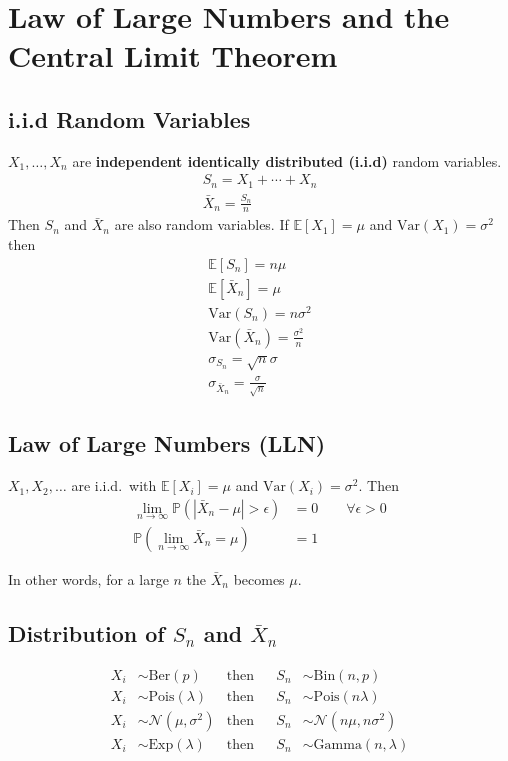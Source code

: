 \section{Law of Large Numbers and the Central Limit Theorem}

\subsection{i.i.d Random Variables}

$X_1, \ldots , X_n$ are \textbf{independent identically distributed (i.i.d)} random variables.
\begin{gather*}
    S_n = X_1 + \cdots + X_n \\
    \bar{X}_n = \frac{S_n}{n}
\end{gather*}
Then $S_n$ and $ \bar{X}_n$ are also random variables.
\newpar{}
If $\mathbb{E}[X_1]=\mu$ and $\mathrm{Var}(X_1)=\sigma^2$ then
\begin{gather*}
    \mathbb{E}[S_n]=n\mu \\
    \mathbb{E}[\bar{X}_n]=\mu \\
    \mathrm{Var}(S_n)=n\sigma^2 \\
    \mathrm{Var}(\bar{X}_n)=\frac{\sigma^2}{n} \\
    \sigma_{S_n}=\sqrt{n}\sigma \\
    \sigma_{\bar{X}_n}=\frac{\sigma}{\sqrt{n}}
\end{gather*}

\subsection{Law of Large Numbers (LLN)}
$X_1, X_2, \ldots$ are i.i.d.\ with $\mathbb{E}[X_i]=\mu$ and $\mathrm{Var}(X_i)=\sigma^2$. Then
\begin{align*}
    \lim_{n\to\infty}\mathbb{P}\left(\left|\bar{X}_n-\mu\right|>\epsilon\right) & =0 \qquad \forall \epsilon > 0 \\
    \mathbb{P}\left(\lim_{n\to\infty}\bar{X}_n=\mu\right)                       & =1
\end{align*}

In other words, for a large $n$ the $\bar{X}_n$ becomes $\mu$.

\subsection[LLN Examples]{Distribution of $S_n$ and $\bar{X}_n$}
\noindent\begin{align*}
    X_i & \sim \mathrm{Ber}(p)            & \text{then} &  & S_n & \sim \mathrm{Bin}(n,p)            \\
    X_i & \sim \mathrm{Pois}(\lambda)     & \text{then} &  & S_n & \sim \mathrm{Pois}(n\lambda)      \\
    X_i & \sim \mathcal{N}(\mu, \sigma^2) & \text{then} &  & S_n & \sim \mathcal{N}(n\mu, n\sigma^2) \\
    X_i & \sim \mathrm{Exp}(\lambda)      & \text{then} &  & S_n & \sim \mathrm{Gamma}(n, \lambda)
\end{align*}

